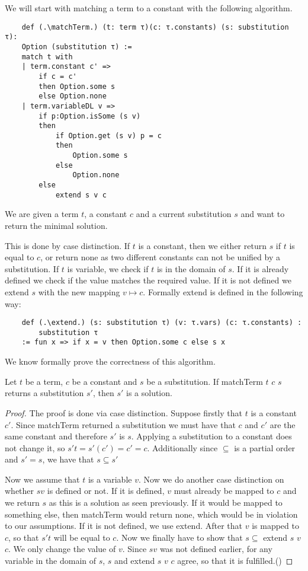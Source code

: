 We will start with matching a term to a constant with the following algorithm.

\begin{lstlisting}
    def (.\matchTerm.) (t: term τ)(c: τ.constants) (s: substitution τ):
    Option (substitution τ) :=
    match t with
    | term.constant c' =>
        if c = c'
        then Option.some s
        else Option.none
    | term.variableDL v =>
        if p:Option.isSome (s v)
        then  
            if Option.get (s v) p = c
            then
                Option.some s
            else
                Option.none
        else
            extend s v c
\end{lstlisting}

We are given a term $t$, a constant $c$ and a current substitution $s$ and want to return the minimal solution.

This is done by case distinction. If $t$ is a constant, then we either return $s$ if $t$ is equal to $c$, or return none as two different constants can not be unified by a substitution. If $t$ is variable, we check if $t$ is in the domain of $s$. If it is already defined we check if the value matches the required value. If it is not defined we extend $s$ with the new mapping $v \mapsto c$.
Formally extend is defined in the following way:

\begin{lstlisting}
    def (.\extend.) (s: substitution τ) (v: τ.vars) (c: τ.constants) :
        substitution τ 
    := fun x => if x = v then Option.some c else s x
\end{lstlisting}

We know formally prove the correctness of this algorithm. 

\begin{lemma}[\matchTermFindsSolution]
    Let $t$ be a term, $c$ be a constant and $s$ be a substitution. If matchTerm $t$ $c$ $s$ returns a substitution $s'$, then $s'$ is a solution.
\end{lemma}
\begin{proof}
The proof is done via case distinction. Suppose firstly that $t$ is a constant $c'$. Since matchTerm returned a substitution we must have that $c$ and $c'$ are the same constant and therefore $s'$ is $s$. Applying a substitution to a constant does not change it, so $s' t = s' (c') = c' = c$. Additionally since $\subseteq$ is a partial order and $s' = s$, we have that $s \subseteq s'$

Now we assume that $t$ is a variable $v$. Now we do another case distinction on whether $s v$ is defined or not. If it is defined, $v$ must already be mapped to $c$ and we return $s$ as this is a solution as seen previously. If it would be mapped to something else, then matchTerm would return none, which would be in violation to our assumptions.
If it is not defined, we use extend. After that $v$ is mapped to $c$, so that $s' t$ will be equal to $c$. Now we finally have to show that $s \subseteq$ extend $s$ $v$ $c$. We only change the value of $v$. Since $s v$ was not defined earlier, for any variable in the domain of $s$, $s$ and extend $s$ $v$ $c$ agree, so that it is fulfilled.(\ssubsetextends)
\end{proof}

